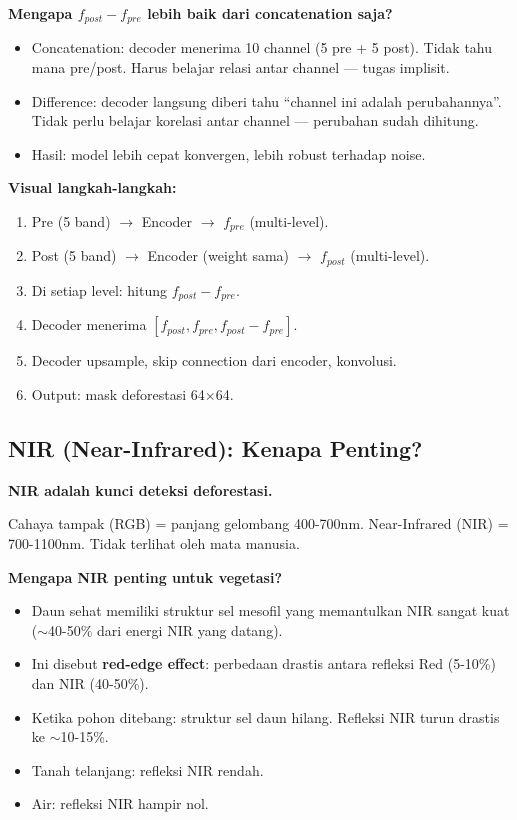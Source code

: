 \documentclass[10pt,a4paper,onecolumn]{article}
\begin{document}
\textbf{Mengapa $f_{post} - f_{pre}$ lebih baik dari concatenation
saja?}
\begin{itemize}[nosep]
    \item Concatenation: decoder menerima 10 channel (5 pre + 5
          post). Tidak tahu mana pre/post. Harus belajar relasi
          antar channel — tugas implisit.
    \item Difference: decoder langsung diberi tahu ``channel ini
          adalah perubahannya''. Tidak perlu belajar korelasi
          antar channel — perubahan sudah dihitung.
    \item Hasil: model lebih cepat konvergen, lebih robust terhadap
          noise.
\end{itemize}

\textbf{Visual langkah-langkah:}
\begin{enumerate}[nosep]
    \item Pre (5 band) $\rightarrow$ Encoder $\rightarrow$
          $f_{pre}$ (multi-level).
    \item Post (5 band) $\rightarrow$ Encoder (weight sama)
          $\rightarrow$ $f_{post}$ (multi-level).
    \item Di setiap level: hitung $f_{post} - f_{pre}$.
    \item Decoder menerima $[f_{post}, f_{pre}, f_{post} - f_{pre}]$.
    \item Decoder upsample, skip connection dari encoder, konvolusi.
    \item Output: mask deforestasi 64$\times$64.
\end{enumerate}

\subsection{NIR (Near-Infrared): Kenapa Penting?}

\textbf{NIR adalah kunci deteksi deforestasi.}

Cahaya tampak (RGB) = panjang gelombang 400-700nm.
Near-Infrared (NIR) = 700-1100nm. Tidak terlihat oleh mata manusia.

\textbf{Mengapa NIR penting untuk vegetasi?}
\begin{itemize}[nosep]
    \item Daun sehat memiliki struktur sel mesofil yang memantulkan
          NIR sangat kuat ($\sim$40-50\% dari energi NIR yang datang).
    \item Ini disebut \textbf{red-edge effect}: perbedaan drastis
          antara refleksi Red (5-10\%) dan NIR (40-50\%).
    \item Ketika pohon ditebang: struktur sel daun hilang.
          Refleksi NIR turun drastis ke $\sim$10-15\%.
    \item Tanah telanjang: refleksi NIR rendah.
    \item Air: refleksi NIR hampir nol.
\end{itemize}
\end{document}
